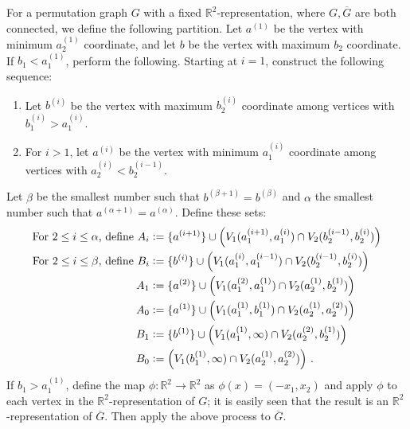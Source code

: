 \documentclass{article}
\newcommand{\define}{\vcentcolon=}
\newcommand{\bR}{\ensuremath{\mathbb{R}}}
\begin{document}
\begin{definition}
	\label{def:permutation decomposition}
	For a permutation graph $G$ with a fixed $\bR^2$-representation, where $G,\overline G$ are both
	connected, we define the following partition.  Let $a^{(1)}$ be the vertex with minimum $a^{(1)}_2$
	coordinate, and let $b$ be the vertex with maximum $b_2$ coordinate. If $b_1 < a^{(1)}_1$, perform
	the following. Starting at $i=1$, construct the following sequence:
	\begin{enumerate}[label=\textup{(\arabic*)}]
		\item Let $b^{(i)}$ be the vertex with maximum $b^{(i)}_2$ coordinate among vertices with $b^{(i)}_1
		> a^{(i)}_1$.
		\item For $i > 1$, let $a^{(i)}$ be the vertex with minimum $a^{(i)}_1$ coordinate among
		vertices with $a^{(i)}_2 < b^{(i-1)}_2$.
	\end{enumerate}
	Let $\beta$ be the smallest number such that $b^{(\beta+1)}=b^{(\beta)}$ and $\alpha$ the smallest number
	such that $a^{(\alpha+1)}=a^{(\alpha)}$. Define these sets:
	\begin{align*}
		\text{For $2 \leq i \leq \alpha$, define } A_i &\define \{a^{(i+1)}\} \cup
		\left( V_1(a^{(i+1)}_1, a^{(i)}_1) \cap V_2(b^{(i-1)}_2, b^{(i)}_2) \right) \\
		\text{For $2 \leq i \leq \beta$, define } B_i &\define \{b^{(i)}\} \cup
		\left( V_1(a^{(i)}_1, a^{(i-1)}_1) \cap V_2(b^{(i-1)}_2, b^{(i)}_2) \right) \\
		A_1 &\define \{a^{(2)}\} \cup
		\left( V_1(a^{(2)}_1, a^{(1)}_1) \cap V_2(a^{(1)}_2, b^{(1)}_2)\right) \\
		A_0 &\define \{a^{(1)}\} \cup
		\left( V_1(a^{(1)}_1, b^{(1)}_1) \cap V_2(a^{(1)}_2, a^{(2)}_2) \right) \\
		B_1 &\define \{b^{(1)}\} \cup
		\left( V_1(a^{(1)}_1, \infty) \cap V_2(a^{(2)}_2, b^{(1)}_2) \right) \\
		B_0 &\define 
		\left( V_1(b^{(1)}_1, \infty) \cap V_2(a^{(1)}_2, a^{(2)}_2) \right) \,.
	\end{align*}
	If $b_1 > a^{(1)}_1$, define the map $\phi : \bR^2 \to \bR^2$ as $\phi(x) = (-x_1,x_2)$ and apply
	$\phi$ to each vertex in the $\bR^2$-representation of $G$; it is easily seen that the result is an
	$\bR^2$-representation of $\overline G$. Then apply the above process to $\overline G$.
\end{definition}
\end{document}
